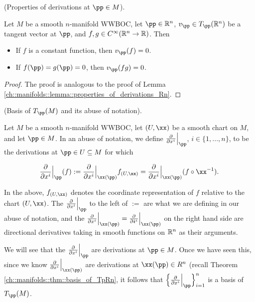 \begin{theorem}
     (Properties of derivations at $\pp \in M$).
    
    Let $M$ be a smooth $n$-manifold WWBOC, let $\pp \in \R^n$, $v_\pp \in T_\pp(\R^n)$ be a tangent vector at $\pp$, and $f, g \in C^\infty(\mathbb{R}^n \rightarrow \mathbb{R})$. Then
    
    \begin{itemize}
        \item If $f$ is a constant function, then $v_\pp(f) = 0$.
        \item If $f(\pp) = g(\pp) = 0$, then $v_\pp(fg) = 0$.
    \end{itemize}
\end{theorem}
    
\begin{proof}
    The proof is analogous to the proof of Lemma \ref{ch::manifolds::lemma::properties_of_derivations_Rn}.
\end{proof}
    
\begin{defn}
\label{ch::manifolds::defn::basis_of_TpM}
     (Basis of $T_\pp(M)$ and its abuse of notation).
    
    Let $M$ be a smooth $n$-manifold WWBOC, let $(U, \xx)$ be a smooth chart on $M$, and let $\pp \in M$. In an abuse of notation, we define $\frac{\pd}{\pd x^i}\Big|_\pp$, $i \in \{1, ..., n\}$, to be the derivations at $\pp \in U \subseteq M$ for which
    
    \begin{align*}
        \frac{\pd}{\pd x^i}\Big|_\pp(f) := \frac{\pd}{\pd x^i}\Big|_{\xx(\pp)} f_{(U, \xx)} = \frac{\pd}{\pd x^i}\Big|_{\xx(\pp)} (f \circ \xx^{-1}).
    \end{align*}
    
    In the above, $f_{(U, \xx)}$ denotes the coordinate representation of $f$ relative to the chart $(U, \xx)$. The $\frac{\pd}{\pd x^i}\Big|_\pp$ to the left of $:=$ are what we are defining in our abuse of notation, and the $\frac{\pd}{\pd x^i}\Big|_{\xx(\pp)} = \frac{\pd}{\pd \see^i}\Big|_{\xx(\pp)}$ on the right hand side are directional derivatives taking in smooth functions on $\mathbb{R}^n$ as their arguments. 
    
    We will see that the $\frac{\pd}{\pd x^i}\Big|_\pp$ are derivations at $\pp \in M$. Once we have seen this, since we know $\frac{\pd}{\pd x^i}\Big|_{\xx(\pp)}$ are derivations at $\xx(\pp) \in R^n$ (recall Theorem \ref{ch::manifolds::thm::basis_of_TpRn}, it follows that $\Big\{ \frac{\pd}{\pd x^i}\Big|_\pp \Big\}_{i = 1}^n$ is a basis of $T_\pp(M)$.
\end{defn}

